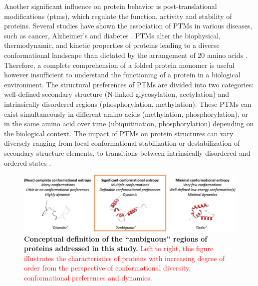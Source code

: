 Another significant influence on protein behavior is post-translational modifications (\gls{ptms}), which regulate the function, activity and stability of proteins. Several studies have shown the association of PTMs in various diseases, such as cancer, Alzheimer’s and diabetes \cite{mclaughlin_where_2016, song_post-translational_2019, bai_proteomic_2021}. PTMs alter the biophysical, thermodynamic, and kinetic properties of proteins leading to a diverse conformational landscape than dictated by the arrangement of 20 amino acids \cite{shental-bechor_effect_2008}. Therefore, a complete comprehension of a folded protein monomer is useful however insufficient to understand the functioning of a protein in a biological environment. The structural preferences of PTMs are divided into two categories: well-defined secondary structure (N-linked glycosylation, acetylation) and intrinsically disordered regions (phosphorylation, methylation). These PTMs can exist simultaneously in different amino acids (methylation, phosphorylation), or in the same amino acid over time (ubiquitination, phosphorylation) depending on the biological context. The impact of PTMs on protein structures can vary diversely ranging from local conformational stabilization or destabilization of secondary structure elements, to transitions between intrinsically disordered and ordered states \cite{bah_modulation_2016}. 

\begin{figure}[tbh]
    \centering
    \includegraphics[width=\linewidth]{ambiguous//figures_ambiguous/fig1.pdf}
    \caption{\textbf{Conceptual definition of the “ambiguous” regions of proteins addressed in this study.} \textcolor{red}{Left to right, this figure illustrates the characteristics of proteins with increasing degree of order from the perspective of conformational diversity, conformational preferences and dynamics.}}
    \label{fig:chapter5:fig1}
\end{figure}

